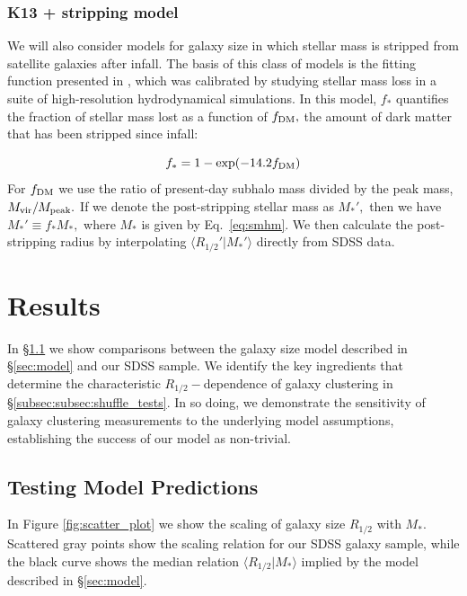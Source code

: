 \documentclass[usenatbib,usegraphicx,letterpaper]{mn2e}
\newcommand{\beq}{\begin{equation}}
\newcommand{\eeq}{\end{equation}}
\newcommand{\rhalf}{R_{1/2}}
\newcommand{\mstar}{M_{\ast}}
\begin{document}
\subsubsection{K13 + stripping model}
\label{subsubsec:strippingmodel}

We will also consider models for galaxy size in which stellar mass is stripped from satellite galaxies after infall. The basis of this class of models is the fitting function presented in \citet{smith_etal16}, which was calibrated by studying stellar mass loss in a suite of high-resolution hydrodynamical simulations. In this model, $f_{\ast}$ quantifies the fraction of stellar mass lost as a function of $f_{\rm DM},$ the amount of dark matter that has been stripped since infall:

\beq
f_{\ast} = 1 - \exp(-14.2f_{\rm DM})
\eeq
For $f_{\rm DM}$ we use the ratio of present-day subhalo mass divided by the peak mass, $M_{\rm vir}/M_{\rm peak}.$ If we denote the post-stripping stellar mass as $M_{\ast}',$ then we have $M_{\ast}'\equiv f_{\ast}M_{\ast},$ where $M_{\ast}$ is given by Eq.~\ref{eq:smhm}. We then calculate the post-stripping radius by interpolating $\langle\rhalf'\vert\mstar'\rangle$ directly from SDSS data. 

\section{Results}
\label{sec:results}

In \S\ref{subsec:predictions} we show comparisons between the galaxy size model described in \S\ref{sec:model} and our SDSS sample. We identify the key ingredients that determine the characteristic $\rhalf-$dependence of galaxy clustering in \S\ref{subsec:subsec:shuffle_tests}. In so doing, we demonstrate the sensitivity of galaxy clustering measurements to the underlying model assumptions, establishing the success of our model as non-trivial. 

\subsection{Testing Model Predictions}
\label{subsec:predictions}

In Figure \ref{fig:scatter_plot} we show the scaling of galaxy size $\rhalf$ with $\mstar.$ Scattered gray points show the scaling relation for our SDSS galaxy sample, while the black curve shows the median relation $\langle\rhalf\vert\mstar\rangle$ implied by the model described in \S\ref{sec:model}.
\end{document}
